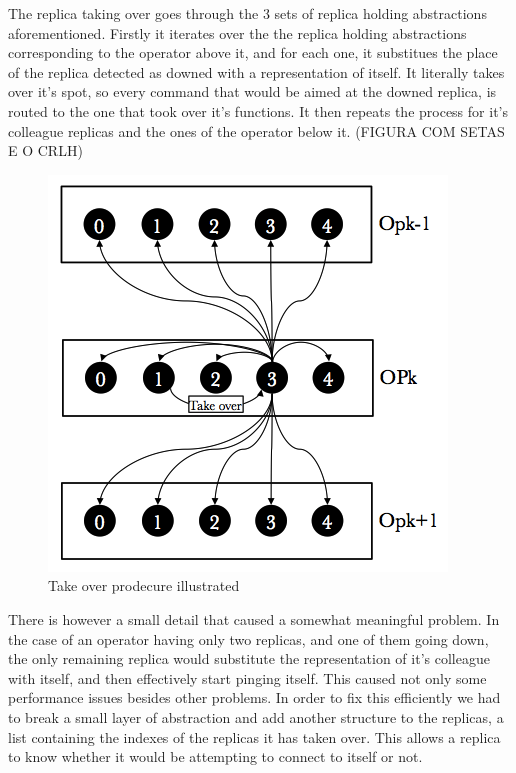 \documentclass[times, 10pt,twocolumn]{article}
\begin{document}

The replica taking over goes through the 3 sets of replica holding abstractions aforementioned.
Firstly it iterates over the the replica holding abstractions corresponding to the operator above it, and for each one, it substitues the place of the replica detected as downed with a representation of itself. It literally takes over it's spot, so every command that would be aimed at the downed replica, is routed to the one that took over it's functions.
It then repeats the process for it's colleague replicas and the ones of the operator below it. (FIGURA COM SETAS E O CRLH)

\begin{figure}[h] 
	\includegraphics[width=\columnwidth]{take_over}
	\caption{Take over prodecure illustrated}
\end{figure}

There is however a small detail that caused a somewhat meaningful problem. In the case of an operator having only two replicas, and one of them going down, the only remaining replica would substitute the representation of it's colleague with itself, and then effectively start pinging itself. This caused not only some performance issues besides other problems.
In order to fix this efficiently we had to break a small layer of abstraction and add another structure to the replicas, a list containing the indexes of the replicas it has taken over. This allows a replica to know whether it would be attempting to connect to itself or not.
\end{document}
